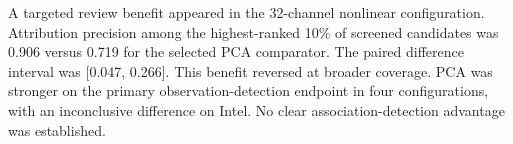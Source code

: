 A targeted review benefit appeared in the 32-channel nonlinear configuration. Attribution precision among the highest-ranked 10\% of screened candidates was 0.906 versus 0.719 for the selected PCA comparator. The paired difference interval was [0.047, 0.266]. This benefit reversed at broader coverage. PCA was stronger on the primary observation-detection endpoint in four configurations, with an inconclusive difference on Intel. No clear association-detection advantage was established.
